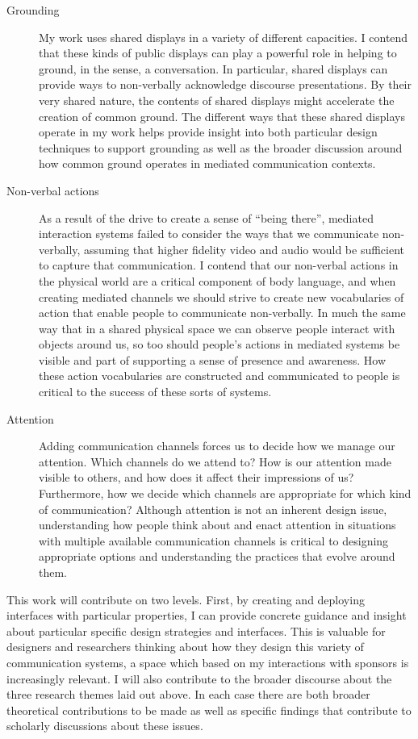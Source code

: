 \documentclass{tufte-handout}
\begin{document}
\begin{description}
	\item[Grounding]{My work uses shared displays in a variety of different capacities. I contend that these kinds of public displays can play a powerful role in helping to ground, in the \citet{Clark:1989uc} sense, a conversation. In particular, shared displays can provide ways to non-verbally acknowledge discourse presentations. By their very shared nature, the contents of shared displays might accelerate the creation of common ground. The different ways that these shared displays operate in my work helps provide insight into both particular design techniques to support grounding as well as the broader discussion around how common ground operates in mediated communication contexts.}
	\item[Non-verbal actions]{As a result of the drive to create a sense of ``being there'', mediated interaction systems failed to consider the ways that we communicate non-verbally, assuming that higher fidelity video and audio would be sufficient to capture that communication. I contend that our non-verbal actions in the physical world are a critical component of body language, and when creating mediated channels we should strive to create new vocabularies of action that enable people to communicate non-verbally. In much the same way that in a shared physical space we can observe people interact with objects around us, so too should people's actions in mediated systems be visible and part of supporting a sense of presence and awareness. How these action vocabularies are constructed and communicated to people is critical to the success of these sorts of systems.}
	\item[Attention]{Adding communication channels forces us to decide how we manage our attention. Which channels do we attend to? How is our attention made visible to others, and how does it affect their impressions of us? Furthermore, how we decide which channels are appropriate for which kind of communication? Although attention is not an inherent design issue, understanding how people think about and enact attention in situations with multiple available communication channels is critical to designing appropriate options and understanding the practices that evolve around them.}
\end{description}

This work will contribute on two levels. First, by creating and deploying interfaces with particular properties, I can provide concrete guidance and insight about particular specific design strategies and interfaces. This is valuable for designers and researchers thinking about how they design this variety of communication systems, a space which based on my interactions with sponsors is increasingly relevant. I will also contribute to the broader discourse about the three research themes laid out above. In each case there are both broader theoretical contributions to be made as well as specific findings that contribute to scholarly discussions about these issues.
\end{document}

